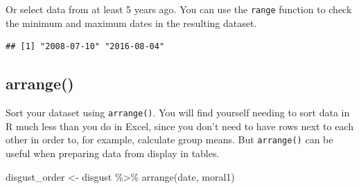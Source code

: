 \documentclass[
  oneside]{book}
\newenvironment{Shaded}{\begin{snugshade}}{\end{snugshade}}
\newcommand{\DecValTok}[1]{\textcolor[rgb]{0.00,0.00,0.81}{#1}}
\newcommand{\FunctionTok}[1]{\textcolor[rgb]{0.00,0.00,0.00}{#1}}
\newcommand{\NormalTok}[1]{#1}
\newcommand{\OtherTok}[1]{\textcolor[rgb]{0.56,0.35,0.01}{#1}}
\newcommand{\SpecialCharTok}[1]{\textcolor[rgb]{0.00,0.00,0.00}{#1}}
\begin{document}
Or select data from at least 5 years ago. You can use the \texttt{range} function to check the minimum and maximum dates in the resulting dataset.

\begin{Shaded}
\end{Shaded}

\begin{verbatim}
## [1] "2008-07-10" "2016-08-04"
\end{verbatim}

\hypertarget{arrange}{%
\subsection{arrange()}\label{arrange}}

Sort your dataset using \texttt{arrange()}. You will find yourself needing to sort data in R much less than you do in Excel, since you don't need to have rows next to each other in order to, for example, calculate group means. But \texttt{arrange()} can be useful when preparing data from display in tables.

\begin{Shaded}
\begin{Highlighting}[]
\NormalTok{disgust\_order }\OtherTok{\textless{}{-}}\NormalTok{ disgust }\SpecialCharTok{\%\textgreater{}\%}
  \FunctionTok{arrange}\NormalTok{(date, moral1)}
\end{Highlighting}
\end{Shaded}
\end{document}
